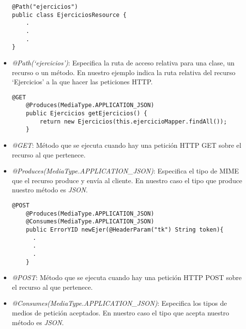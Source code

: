 \begin{itemize}

\vspace{1em}
{\codesize
\lstset{}
\begin{lstlisting}[frame=single]
@Path("ejercicios")
public class EjerciciosResource {
	.
	.
	.
}
\end{lstlisting}
}
\vspace{1em}

\item \textit{@Path(`ejercicios')}: Especifica la ruta de acceso relativa para una clase, un recurso o un método. En nuestro ejemplo indica la ruta relativa del recurso `Ejercicios' a la que hacer las peticiones HTTP.


\vspace{1em}
{\codesize
\lstset{}
\begin{lstlisting}[frame=single]
    @GET
    @Produces(MediaType.APPLICATION_JSON)
    public Ejercicios getEjercicios() {
        return new Ejercicios(this.ejercicioMapper.findAll());
    }
\end{lstlisting}
}
\vspace{1em}

\item \textit{@GET}: Método que se ejecuta cuando hay una petición HTTP GET sobre el recurso al que pertenece.

\item \textit{@Produces(MediaType.APPLICATION\_JSON)}: Especifica el tipo de MIME que el recurso produce y envía al cliente. En nuestro caso el tipo que produce nuestro método es \textit{JSON}.


\vspace{1em}
{\codesize
\lstset{}
\begin{lstlisting}[frame=single]
    @POST
    @Produces(MediaType.APPLICATION_JSON)
    @Consumes(MediaType.APPLICATION_JSON)
    public ErrorYID newEjer(@HeaderParam("tk") String token){
      .
      .
      .
    }
\end{lstlisting}
}
\vspace{1em}

\item \textit{@POST}: Método que se ejecuta cuando hay una petición HTTP POST sobre el recurso al que pertenece.

\item \textit{@Consumes(MediaType.APPLICATION\_JSON)}: Especifica los tipos de medios de petición aceptados. En nuestro caso el tipo que acepta nuestro método es \textit{JSON}.


\end{itemize}
